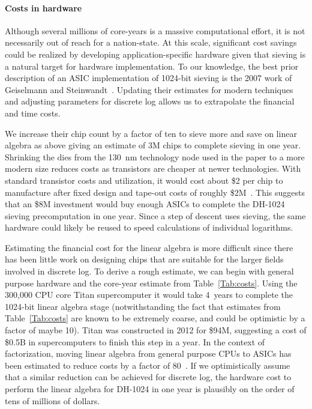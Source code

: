 \paragraph{Costs in hardware}
Although several millions of core-years is a massive computational effort, it is not
necessarily out of reach for a nation-state.  At this scale,
significant cost savings could be realized by developing
application-specific hardware given that
sieving is a natural target for hardware implementation.  To our
knowledge, the best prior description of an ASIC implementation of
1024-bit sieving is the 2007 work of Geiselmann and
Steinwandt~\cite{GeSt07}.  Updating their estimates for modern
techniques and adjusting parameters for discrete log allows us to extrapolate the financial and time costs.

We increase their chip count by a factor of ten to sieve more and save on
linear algebra as above giving an estimate of 3M chips to
complete sieving in one year.  Shrinking the dies from the 130~nm
technology node used in the paper to a more modern size reduces costs as transistors are cheaper at newer technologies.
With standard transistor costs and utilization, it
would cost about \$2 per chip to manufacture after fixed design and
tape-out costs of roughly \$2M~\cite{jefferiesReport}.  This suggests
that an \$8M investment would buy enough ASICs to complete the DH-1024
sieving precomputation in one year. Since a step of descent
uses sieving, the same hardware could likely be reused to speed
calculations of individual logarithms.

Estimating the financial cost for the linear algebra is more
difficult since there has been little work on designing chips that
are suitable for the larger fields involved in discrete log.  To
derive a rough estimate, we can begin with general purpose hardware
and the core-year estimate from Table~\ref{Tab:costs}. Using the 300,000
CPU core Titan supercomputer it would take 4~years to complete
the 1024-bit linear algebra stage (notwithstanding the fact that
estimates from Table~\ref{Tab:costs} are known to be extremely coarse,
and could be optimistic by a factor of maybe 10).  Titan was constructed in 2012
for \$94M, suggesting a cost of \$0.5B in supercomputers to finish this
step in a year.  In the context of factorization, moving
linear algebra from general purpose CPUs to ASICs has been estimated
to reduce costs by a factor of 80~\cite{geiselmann2005improved}.  If we optimistically assume that a similar reduction can be
achieved for discrete log, the hardware cost to perform the linear
algebra for DH-1024 in one year is plausibly on the order of tens
of millions of dollars.

